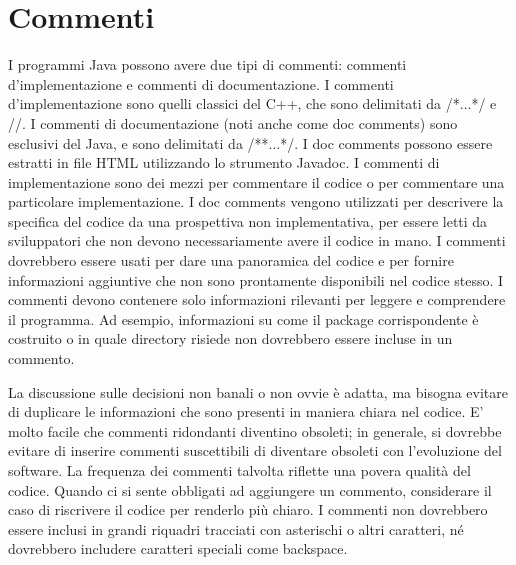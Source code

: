 \section{Commenti}
I programmi Java possono avere due tipi di commenti: commenti d’implementazione e commenti di documentazione. I commenti d’implementazione sono quelli classici del C++, che sono delimitati da /*...*/ e //. I commenti di documentazione (noti anche come doc comments) sono esclusivi del Java, e sono delimitati da /**...*/. I doc comments possono essere estratti in file HTML utilizzando lo strumento Javadoc.
I commenti di implementazione sono dei mezzi per commentare il codice o per commentare una particolare implementazione. I doc comments vengono utilizzati per descrivere la specifica del codice da una prospettiva non implementativa, per essere letti da sviluppatori che non devono necessariamente avere il codice in mano.
I commenti dovrebbero essere usati per dare una panoramica del codice e per fornire informazioni aggiuntive che non sono prontamente disponibili nel codice stesso. I commenti devono contenere solo informazioni rilevanti per leggere e comprendere il programma. Ad esempio, informazioni su come il package corrispondente è costruito o in quale directory risiede non dovrebbero essere incluse in un commento.

La discussione sulle decisioni non banali o non ovvie è adatta, ma bisogna evitare di duplicare le informazioni che sono presenti in maniera chiara nel codice. E’ molto facile che commenti ridondanti diventino obsoleti; in generale, si dovrebbe evitare di inserire commenti suscettibili di diventare obsoleti con l’evoluzione del software.
La frequenza dei commenti talvolta riflette una povera qualità del codice. Quando ci si sente obbligati ad aggiungere un commento, considerare il caso di riscrivere il codice per renderlo più chiaro.
I commenti non dovrebbero essere inclusi in grandi riquadri tracciati con asterischi o altri caratteri, né dovrebbero includere caratteri speciali come backspace.


